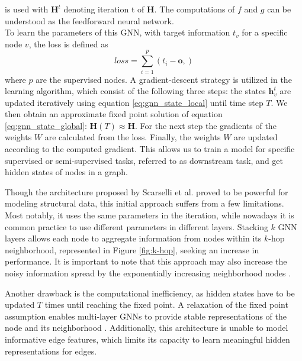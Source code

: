 is used with $\mathbf{H}^{t}$ denoting iteration t of $\mathbf{H}$. The computations of $f$ and $g$ can be understood as the feedforward neural network. \\
To learn the parameters of this GNN, with target information $t_v$ for a specific node $v$, the loss is defined as
\begin{equation}
    loss = \sum_{i=1}^p (t_i-\mathbf{o},)
\end{equation}
where $p$ are the supervised nodes. A gradient-descent strategy is utilized in the learning algorithm, which consist of the following three steps: the states $\mathbf{h}_v^{t}$ are updated iteratively using equation \eqref{eq:gnn_state_local} until time step $T$. We then obtain an approximate fixed point solution of equation \eqref{eq:gnn_state_global}: $\mathbf{H}(T)\approx\mathbf{H}$. For the next step the gradients of the weights $W$ are calculated from the loss. Finally, the weights $W$ are updated according to the computed gradient. This allows us to train a model for specific supervised or semi-supervised tasks, referred to as downstream task, and get hidden states of nodes in a graph. \bigskip

Though the architecture proposed by Scarselli et al. \cite{4700287} proved to be powerful for modeling structural data, this initial approach suffers from a few limitations. Most notably, it uses the same parameters in the iteration, while nowadays it is common practice to use different parameters in different layers. Stacking $k$ GNN layers allows each node to aggregate information from nodes within its $k$-hop neighborhood, represented in Figure \ref{fig:k-hop}, seeking an increase in performance. It is important to note that this approach may also increase the noisy information spread by the exponentially increasing neighborhood nodes \cite{Liu2020}.

Another drawback is the computational inefficiency, as hidden states have to be updated $T$ times until reaching the fixed point. A relaxation of the fixed point assumption enables multi-layer GNNs to provide stable representations of the node and its neighborhood \cite{li2015gated}. Additionally, this architecture is unable to model informative edge features, which limits its capacity to learn meaningful hidden representations for edges.

